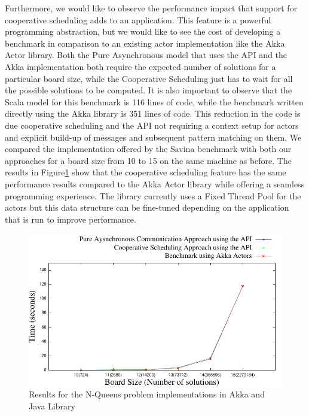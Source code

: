 \par Furthermore, we would like to observe the performance impact that support for cooperative scheduling adds to an application. This feature is a powerful programming abstraction, but we would like to see the cost of developing a benchmark in comparison to an existing actor implementation like the Akka Actor library. Both the Pure Asynchronous model that uses the API and the Akka implementation both require the expected number of solutions for a particular board size, while the Cooperative Scheduling just has to wait for all the possible solutions to be computed. It is also important to observe that the Scala model for this benchmark is 116 lines of code, while the benchmark written directly using the Akka library is 351 lines of code. This reduction in the code is due cooperative scheduling and the API not requiring a context setup for actors and explicit build-up of messages and subsequent pattern matching on them.  We compared the implementation offered by the Savina benchmark with both our approaches for a board size from 10 to 15 on the same machine as before. The results in Figure\ref{aj} show that the cooperative scheduling feature has the same performance results compared to the Akka Actor library while offering a seamless programming experience. The library currently uses a Fixed Thread Pool for the actors but this data structure can be fine-tuned depending on the application that is run to improve performance.

\begin{figure}
\centering
\includegraphics[scale=.7]{akkaapi.pdf}
\caption{Results for the N-Queens problem implementations in Akka and Java Library}
\label{aj}
\end{figure}

